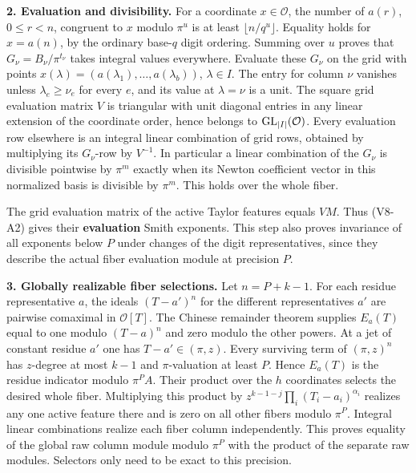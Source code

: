 \documentclass[
  11pt,
]{article}
\begin{document}
\textbf{2. Evaluation and divisibility.} For a coordinate
\(x\in\mathcal O\), the number of \(a(r)\), \(0\le r<n\), congruent to
\(x\) modulo \(\pi^u\) is at least \(\lfloor n/q^u\rfloor\). Equality
holds for \(x=a(n)\), by the ordinary base-\(q\) digit ordering. Summing
over \(u\) proves that \(G_\nu=B_\nu/\pi^{t_\nu}\) takes integral values
everywhere. Evaluate these \(G_\nu\) on the grid with points
\(x(\lambda)=(a(\lambda_1),\ldots,a(\lambda_b))\), \(\lambda\in I\). The
entry for column \(\nu\) vanishes unless \(\lambda_e\ge\nu_e\) for every
\(e\), and its value at \(\lambda=\nu\) is a unit. The square grid
evaluation matrix \(V\) is triangular with unit diagonal entries in any
linear extension of the coordinate order, hence belongs to
\({\rm GL}_{|I|}(\mathcal O)\). Every evaluation row elsewhere is an
integral linear combination of grid rows, obtained by multiplying its
\(G_\nu\)-row by \(V^{-1}\). In particular a linear combination of the
\(G_\nu\) is divisible pointwise by \(\pi^m\) exactly when its Newton
coefficient vector in this normalized basis is divisible by \(\pi^m\).
This holds over the whole fiber.

The grid evaluation matrix of the active Taylor features equals \(VM\).
Thus (V8-A2) gives their \textbf{evaluation} Smith exponents. This step
also proves invariance of all exponents below \(P\) under changes of the
digit representatives, since they describe the actual fiber evaluation
module at precision \(P\).

\textbf{3. Globally realizable fiber selections.} Let \(n=P+k-1\). For
each residue representative \(a\), the ideals \((T-a')^n\) for the
different representatives \(a'\) are pairwise comaximal in
\(\mathcal O[T]\). The Chinese remainder theorem supplies \(E_a(T)\)
equal to one modulo \((T-a)^n\) and zero modulo the other powers. At a
jet of constant residue \(a'\) one has \(T-a'\in(\pi,z)\). Every
surviving term of \((\pi,z)^n\) has \(z\)-degree at most \(k-1\) and
\(\pi\)-valuation at least \(P\). Hence \(E_a(T)\) is the residue
indicator modulo \(\pi^P A\). Their product over the \(h\) coordinates
selects the desired whole fiber. Multiplying this product by
\(z^{k-1-j}\prod_i(T_i-a_i)^{\alpha_i}\) realizes any one active feature
there and is zero on all other fibers modulo \(\pi^P\). Integral linear
combinations realize each fiber column independently. This proves
equality of the global raw column module modulo \(\pi^P\) with the
product of the separate raw modules. Selectors only need to be exact to
this precision.
\end{document}
